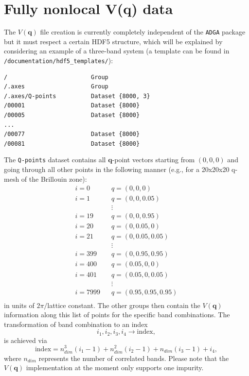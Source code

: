 \documentclass[a4paper,11pt]{article}
\numberwithin{equation}{section} %
\begin{document}
\newpage
\section{Fully nonlocal V(q) data}
The $V(\mathbf{q})$ file creation is currently completely independent of the \verb+ADGA+ package but it must respect a certain HDF5 structure,
which will be explained by considering an example of a three-band system (a template can be found in {\color{blue}\verb+/documentation/hdf5_templates/+}):
\begin{lstlisting}[caption=$V(q)$ file structure, frame=single,
basicstyle=\small]
/                        Group
/.axes                   Group
/.axes/Q-points          Dataset {8000, 3}
/00001                   Dataset {8000}
/00005                   Dataset {8000}
...
/00077                   Dataset {8000}
/00081                   Dataset {8000}
\end{lstlisting}
The \verb|Q-points| dataset contains all $\mathbf{q}$-point vectors starting from $(0,0,0)$ and going through all other points in the following manner (e.g., for a 20x20x20 q-mesh of the Brillouin zone):
\begin{equation*}
\begin{aligned}
i = 0\;\;\;& q = (0,0,0)\\
i = 1\;\;\;& q = (0,0,0.05)\\
&\vdots \\
i = 19\;\;\;& q = (0,0,0.95)\\
i = 20\;\;\;& q = (0,0.05,0)\\
i = 21\;\;\;& q = (0,0.05,0.05)\\
&\vdots \\
i = 399\;\;\;& q = (0,0.95,0.95)\\
i = 400\;\;\;& q = (0.05,0,0)\\
i = 401\;\;\;& q = (0.05,0,0.05)\\
&\vdots \\
i = 7999\;\;\;& q = (0.95,0.95,0.95)\\
\end{aligned}
\end{equation*}
in units of $2\pi/$lattice constant.
The other groups then contain the $V(\mathbf{q})$ information along this list of points for the specific band combinations. The transformation of band combination to an index
\begin{equation*}
i_1,i_2,i_3,i_4 \rightarrow \mathrm{index},
\end{equation*}
is achieved via
\begin{equation*}
\mathrm{index} = n_{dim}^3(i_1-1) + n_{dim}^2(i_2-1) + n_{dim}(i_3-1) + i_4,
\end{equation*}
where $n_{dim}$ represents the number of correlated bands.
Please note that the $V(\mathbf{q})$ implementation at the moment only supports one impurity.
\end{document}
